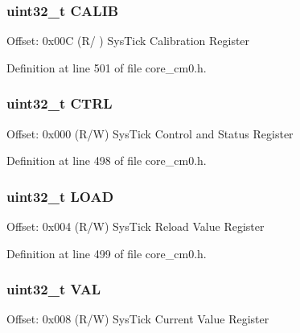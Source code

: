 \subsubsection[{\texorpdfstring{C\+A\+L\+IB}{CALIB}}]{ uint32\+\_\+t C\+A\+L\+IB}\hypertarget{struct_sys_tick___type_aedf0dff29a9cacdaa2fb7eec6b116a13}{}\label{struct_sys_tick___type_aedf0dff29a9cacdaa2fb7eec6b116a13}
Offset\+: 0x00C (R/ ) Sys\+Tick Calibration Register 

Definition at line 501 of file core\+\_\+cm0.\+h.

\subsubsection[{\texorpdfstring{C\+T\+RL}{CTRL}}]{ uint32\+\_\+t C\+T\+RL}\hypertarget{struct_sys_tick___type_ac81efc171e9852a36caeb47122bfec5b}{}\label{struct_sys_tick___type_ac81efc171e9852a36caeb47122bfec5b}
Offset\+: 0x000 (R/W) Sys\+Tick Control and Status Register 

Definition at line 498 of file core\+\_\+cm0.\+h.

\subsubsection[{\texorpdfstring{L\+O\+AD}{LOAD}}]{ uint32\+\_\+t L\+O\+AD}\hypertarget{struct_sys_tick___type_a0c1333686137b7e25a46bd548a5b5bc3}{}\label{struct_sys_tick___type_a0c1333686137b7e25a46bd548a5b5bc3}
Offset\+: 0x004 (R/W) Sys\+Tick Reload Value Register 

Definition at line 499 of file core\+\_\+cm0.\+h.

\subsubsection[{\texorpdfstring{V\+AL}{VAL}}]{ uint32\+\_\+t V\+AL}\hypertarget{struct_sys_tick___type_ae7a655a853654127f3dfb7fa32c3f457}{}\label{struct_sys_tick___type_ae7a655a853654127f3dfb7fa32c3f457}
Offset\+: 0x008 (R/W) Sys\+Tick Current Value Register 

